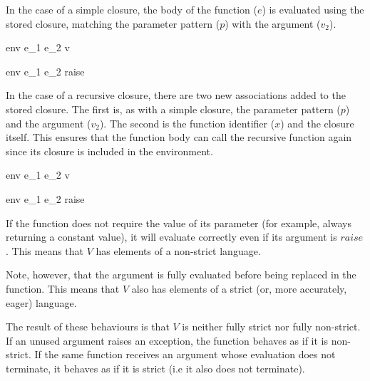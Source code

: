 \documentclass{article}
\begin{document}
In the case of a simple closure, the body of the function ($e$) is evaluated using the stored closure, matching the parameter pattern ($p$) with the argument ($v_2$).

    {\mbox{env} \vdash e_1 \; e_2 \Downarrow v}

    {\mbox{env} \vdash e_1 \; e_2 \Downarrow raise}

In the case of a recursive closure, there are two new associations added to the stored closure.
The first is, as with a simple closure, the parameter pattern ($p$) and the argument ($v_2$).
The second is the function identifier ($x$) and the closure itself.
This ensures that the function body can call the recursive function again since its closure is included in the environment.

    {\mbox{env} \vdash e_1 \; e_2 \Downarrow v}

    {\mbox{env} \vdash e_1 \; e_2 \Downarrow raise}

If the function does not require the value of its parameter (for example, always returning a constant value), it will evaluate correctly even if its argument is $raise$.
This means that $V$ has elements of a non-strict language.

Note, however, that the argument is fully evaluated before being replaced in the function.
This means that $V$ also has elements of a strict (or, more accurately, eager) language.

The result of these behaviours is that $V$ is neither fully strict nor fully non-strict.
If an unused argument raises an exception, the function behaves as if it is non-strict.
If the same function receives an argument whose evaluation does not terminate, it behaves as if it is strict (i.e it also does not terminate).
\end{document}
